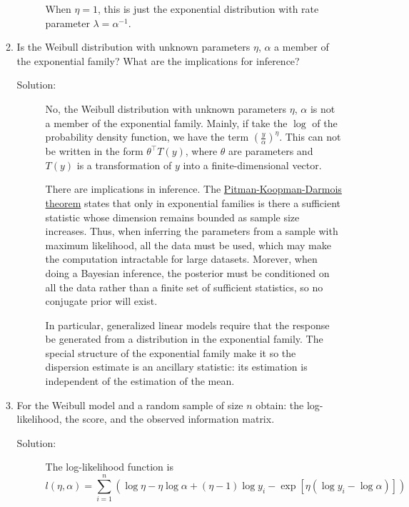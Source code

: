 \documentclass[letterpaper,11pt]{article}
\begin{document}
\begin{enumerate}
\begin{enumerate}
\begin{description}
    When $\eta = 1$, this is just the exponential distribution with rate
    parameter $\lambda = \alpha^{-1}$.       
  \end{description}
\item Is the Weibull distribution with unknown parameters $\eta$, $\alpha$ a
  member of the exponential family? What are the implications for inference?
  \begin{description}
  \item[Solution:] No, the Weibull distribution with unknown parameters $\eta$,
    $\alpha$ is not a member of the exponential family. Mainly, if take the
    $\log$ of the probability density function, we have the term
    $\left(\frac{y}{\alpha}\right)^\eta$. This can not be written in the form
    $\theta^\intercal T(y)$, where $\theta$ are parameters and $T(y)$ is a
    transformation of $y$ into a finite-dimensional vector.

    There are implications in inference. The
    \href{https://en.wikipedia.org/wiki/Sufficient_statistic#Exponential\_family}{Pitman-Koopman-Darmois
      theorem} states that only in exponential families is there a sufficient
    statistic whose dimension remains bounded as sample size increases. Thus,
    when inferring the parameters from a sample with maximum likelihood, all the
    data must be used, which may make the computation intractable for large
    datasets. Morever, when doing a Bayesian inference, the posterior must be
    conditioned on all the data rather than a finite set of sufficient
    statistics, so no conjugate prior will exist.

    In particular, generalized linear models require that the response be
    generated from a distribution in the exponential family. The special
    structure of the exponential family make it so the dispersion estimate is an
    ancillary statistic: its estimation is independent of the estimation of the
    mean.
  \end{description}

\item For the Weibull model and a random sample of size $n$ obtain: the
  log-likelihood, the score, and the observed information matrix.

  \begin{description}
  \item[Solution:] The log-likelihood function is
    \begin{equation}
      l\left(\eta,\alpha\right)
      = \sum_{i = 1}^n\left(
        \log\eta - \eta\log\alpha + \left(\eta - 1\right)\log y_i
        - \exp\left[\eta\left(\log y_i - \log\alpha\right)\right]\right)
    \end{equation}


\end{description}
\end{enumerate}
\end{enumerate}
\end{document}
